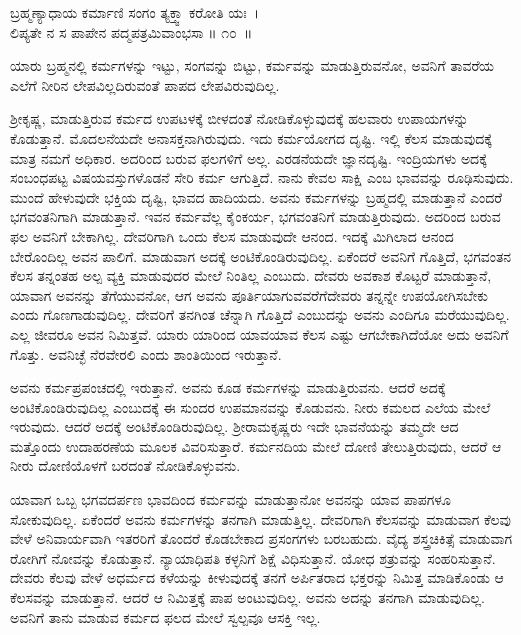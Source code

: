\begin{shloka}
ಬ್ರಹ್ಮಣ್ಯಾಧಾಯ ಕರ್ಮಾಣಿ ಸಂಗಂ ತ್ಯಕ್ತ್ವಾ ಕರೋತಿ ಯಃ~।\\ಲಿಪ್ಯತೇ ನ ಸ ಪಾಪೇನ ಪದ್ಮಪತ್ರಮಿವಾಂಭಸಾ \hfill॥ ೧೦~॥
\end{shloka}

\begin{artha}
ಯಾರು ಬ್ರಹ್ಮನಲ್ಲಿ ಕರ್ಮಗಳನ್ನು ಇಟ್ಟು, ಸಂಗವನ್ನು ಬಿಟ್ಟು, ಕರ್ಮವನ್ನು ಮಾಡುತ್ತಿರುವನೋ, ಅವನಿಗೆ ತಾವರೆಯ ಎಲೆಗೆ ನೀರಿನ ಲೇಪವಿಲ್ಲದಿರುವಂತೆ ಪಾಪದ ಲೇಪವಿರುವುದಿಲ್ಲ.
\end{artha}

ಶ‍್ರೀಕೃಷ್ಣ, ಮಾಡುತ್ತಿರುವ ಕರ್ಮದ ಉಪಟಳಕ್ಕೆ ಬೀಳದಂತೆ ನೋಡಿಕೊಳ್ಳುವುದಕ್ಕೆ ಹಲವಾರು ಉಪಾಯಗಳನ್ನು ಕೊಡುತ್ತಾನೆ. ಮೊದಲನೆಯದೇ ಅನಾಸಕ್ತನಾಗಿರುವುದು. ಇದು ಕರ್ಮ\-ಯೋಗದ ದೃಷ್ಟಿ. ಇಲ್ಲಿ ಕೆಲಸ ಮಾಡುವುದಕ್ಕೆ ಮಾತ್ರ ನಮಗೆ ಅಧಿಕಾರ. ಅದರಿಂದ ಬರುವ ಫಲಗಳಿಗೆ ಅಲ್ಲ. ಎರಡನೆಯದೇ ಜ್ಞಾನದೃಷ್ಟಿ. ಇಂದ್ರಿಯಗಳು ಅದಕ್ಕೆ ಸಂಬಂಧಪಟ್ಟ ವಿಷಯವಸ್ತುಗಳೊಡನೆ ಸೇರಿ ಕರ್ಮ ಆಗುತ್ತಿದೆ. ನಾನು ಕೇವಲ ಸಾಕ್ಷಿ ಎಂಬ ಭಾವವನ್ನು ರೂಢಿಸುವುದು. ಮುಂದೆ ಹೇಳುವುದೇ ಭಕ್ತಿಯ ದೃಷ್ಟಿ, ಭಾವದ ಹಾದಿಯದು. ಅವನು ಕರ್ಮಗಳನ್ನು ಬ್ರಹ್ಮದಲ್ಲಿ ಮಾಡುತ್ತಾನೆ ಎಂದರೆ ಭಗವಂತನಿಗಾಗಿ ಮಾಡುತ್ತಾನೆ. ಇವನ ಕರ್ಮವೆಲ್ಲ ಕೈಂಕರ್ಯ, ಭಗವಂತನಿಗೆ ಮಾಡುತ್ತಿರುವುದು. ಅದರಿಂದ ಬರುವ ಫಲ ಅವನಿಗೆ ಬೇಕಾಗಿಲ್ಲ. ದೇವರಿಗಾಗಿ ಒಂದು ಕೆಲಸ ಮಾಡುವುದೇ ಆನಂದ. ಇದಕ್ಕೆ ಮಿಗಿಲಾದ ಆನಂದ ಬೇರೊಂದಿಲ್ಲ ಅವನ ಪಾಲಿಗೆ. ಮಾಡುವಾಗ ಅದಕ್ಕೆ ಅಂಟಿಕೊಂಡಿರುವುದಿಲ್ಲ. ಏಕೆಂದರೆ ಅವನಿಗೆ ಗೊತ್ತಿದೆ, ಭಗವಂತನ ಕೆಲಸ ತನ್ನಂತಹ ಅಲ್ಪ ವ್ಯಕ್ತಿ ಮಾಡುವುದರ ಮೇಲೆ ನಿಂತಿಲ್ಲ ಎಂಬುದು. ದೇವರು ಅವಕಾಶ ಕೊಟ್ಟರೆ ಮಾಡುತ್ತಾನೆ, ಯಾವಾಗ ಅವನನ್ನು ತೆಗೆಯುವನೋ, ಆಗ ಅವನು ಪೂರ್ತಿಯಾಗುವವರೆಗೆ\break ದೇವರು ತನ್ನನ್ನೇ ಉಪಯೋಗಿಸಬೇಕು ಎಂದು ಗೊಣಗಾಡುವುದಿಲ್ಲ. ದೇವರಿಗೆ ತನಗಿಂತ ಚೆನ್ನಾಗಿ ಗೊತ್ತಿದೆ ಎಂಬುದನ್ನು ಅವನು ಎಂದಿಗೂ ಮರೆಯುವುದಿಲ್ಲ. ಎಲ್ಲ ಜೀವರೂ ಅವನ ನಿಮಿತ್ತವೆ. ಯಾರು ಯಾರಿಂದ ಯಾವಯಾವ ಕೆಲಸ ಎಷ್ಟು ಆಗಬೇಕಾಗಿದೆಯೋ ಅದು ಅವನಿಗೆ ಗೊತ್ತು. ಅವನಿಚ್ಛೆ ನೆರವೇರಲಿ ಎಂದು ಶಾಂತಿಯಿಂದ ಇರುತ್ತಾನೆ.

ಅವನು ಕರ್ಮಪ್ರಪಂಚದಲ್ಲಿ ಇರುತ್ತಾನೆ. ಅವನು ಕೂಡ ಕರ್ಮಗಳನ್ನು ಮಾಡುತ್ತಿರುವನು. ಆದರೆ ಅದಕ್ಕೆ ಅಂಟಿಕೊಂಡಿರುವುದಿಲ್ಲ ಎಂಬುದಕ್ಕೆ ಈ ಸುಂದರ ಉಪಮಾನವನ್ನು ಕೊಡುವನು. ನೀರು ಕಮಲದ ಎಲೆಯ ಮೇಲೆ ಇರುವುದು. ಆದರೆ ಅದಕ್ಕೆ ಅಂಟಿಕೊಂಡಿರುವುದಿಲ್ಲ. ಶ‍್ರೀರಾಮಕೃಷ್ಣರು ಇದೇ ಭಾವನೆಯನ್ನು ತಮ್ಮದೇ ಆದ ಮತ್ತೊಂದು ಉದಾಹರಣೆಯ ಮೂಲಕ ವಿವರಿಸುತ್ತಾರೆ. ಕರ್ಮನದಿಯ ಮೇಲೆ ದೋಣಿ ತೇಲುತ್ತಿರುವುದು, ಆದರೆ ಆ ನೀರು ದೋಣಿಯೊಳಗೆ ಬರದಂತೆ ನೋಡಿಕೊಳ್ಳುವನು.

ಯಾವಾಗ ಒಬ್ಬ ಭಗವದರ್ಪಣ ಭಾವದಿಂದ ಕರ್ಮವನ್ನು ಮಾಡುತ್ತಾನೋ ಅವನನ್ನು ಯಾವ ಪಾಪಗಳೂ ಸೋಕುವುದಿಲ್ಲ. ಏಕೆಂದರೆ ಅವನು ಕರ್ಮಗಳನ್ನು ತನಗಾಗಿ ಮಾಡುತ್ತಿಲ್ಲ. ದೇವರಿಗಾಗಿ ಕೆಲಸವನ್ನು ಮಾಡುವಾಗ ಕೆಲವು ವೇಳೆ ಅನಿವಾರ್ಯವಾಗಿ ಇತರರಿಗೆ ತೊಂದರೆ ಕೊಡಬೇಕಾದ ಪ್ರಸಂಗಗಳು ಬರಬಹುದು. ವೈದ್ಯ ಶಸ್ತ್ರಚಿಕಿತ್ಸೆ ಮಾಡುವಾಗ ರೋಗಿಗೆ ನೋವನ್ನು ಕೊಡುತ್ತಾನೆ. ನ್ಯಾಯಾಧಿಪತಿ ಕಳ್ಳನಿಗೆ ಶಿಕ್ಷೆ ವಿಧಿಸುತ್ತಾನೆ. ಯೋಧ ಶತ್ರುವನ್ನು ಸಂಹರಿಸುತ್ತಾನೆ. ದೇವರು ಕೆಲವು ವೇಳೆ ಅಧರ್ಮದ ಕಳೆಯನ್ನು ಕೀಳುವುದಕ್ಕೆ ತನಗೆ ಅರ್ಪಿತರಾದ ಭಕ್ತರನ್ನು ನಿಮಿತ್ತ ಮಾಡಿಕೊಂಡು ಆ ಕೆಲಸವನ್ನು ಮಾಡುತ್ತಾನೆ. ಆದರೆ ಆ ನಿಮಿತ್ತಕ್ಕೆ ಪಾಪ ಅಂಟುವುದಿಲ್ಲ. ಅವನು ಅದನ್ನು ತನಗಾಗಿ ಮಾಡುವುದಿಲ್ಲ. ಅವನಿಗೆ ತಾನು ಮಾಡುವ ಕರ್ಮದ ಫಲದ ಮೇಲೆ ಸ್ವಲ್ಪವೂ ಆಸಕ್ತಿ ಇಲ್ಲ.

